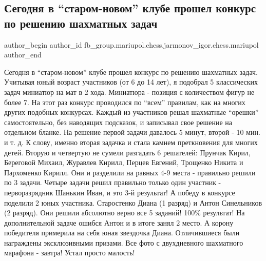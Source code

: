 
 
 
 
 

\subsection{Сегодня в \enquote{старом-новом} клубе прошел конкурс по решению шахматных задач}
\label{sec:20_01_2019.fb.fb_group.mariupol.chess.1.segodnya_v__starom_n}
 
\ifcmt
 author_begin
   author_id fb_group.mariupol.chess,jarmonov_igor.chess.mariupol
 author_end
\fi

Сегодня в \enquote{старом-новом} клубе прошел конкурс по решению шахматных задач.
Учитывая юный возраст участников (от 6 до 14 лет), я подобрал 5 классических
задач миниатюр на мат в 2 хода. Миниатюра - позиция с количеством фигур не
более 7. На этот раз конкурс проводился по \enquote{всем} правилам, как на многих
других подобных конкурсах. Каждый из участников решал шахматные \enquote{орешки}
самостоятельно, без наводящих подсказок, и записывал свое решение на отдельном
бланке. На решение первой задачи давалось 5 минут, второй - 10 мин. и т. д. К
слову, именно вторая задачка и стала камнем преткновения для многих детей.
Вторую и четвертую не сумели разгадать 6 решателей: Прунчак Кирил, Береговой
Михаил, Журавлев Кирилл, Перцев Евгений, Трощенко Никита и Пархоменко Кирилл.
Они и разделили на равных 4-9 места - правильно решили по 3 задачи. Четыре
задачи решил правильно только один участник - перворазрядник Шанькин Иван, и
это 3-й результат! А победу в конкурсе поделили 2 юных участника. Старостенко
Диана (1 разряд) и Антон Синельников (2 разряд). Они решили абсолютно верно все
5 заданий! 100\% результат! На дополнительной задаче ошибся Антон и в итоге
занял 2 место. А корону победителя примерила на себя юная звездочка Диана.
Отличившиеся были награждены эксклюзивными призами. Все фото с двухдневного
шахматного марафона - завтра! Устал просто малость!
